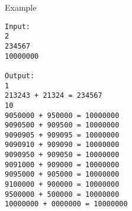 Example
\begin{verbatim}
Input:
2
234567
10000000

Output:
1
213243 + 21324 = 234567
10
9050000 + 950000 = 10000000
9090500 + 909500 = 10000000
9090905 + 909095 = 10000000
9090910 + 909090 = 10000000
9090950 + 909050 = 10000000
9091000 + 909000 = 10000000
9095000 + 905000 = 10000000
9100000 + 900000 = 10000000
9500000 + 500000 = 10000000
10000000 + 0000000 = 10000000

\end{verbatim}